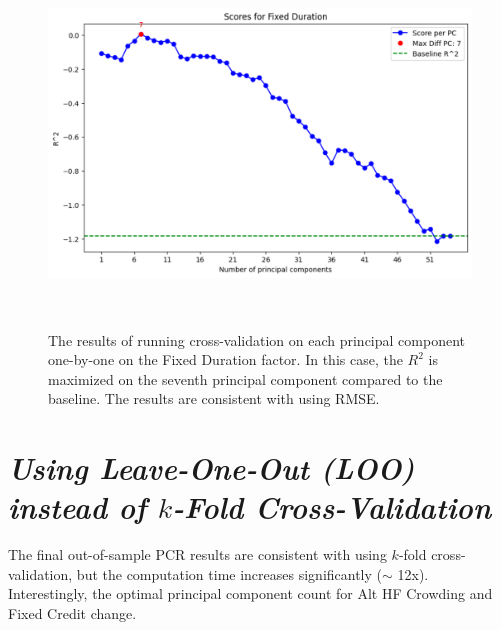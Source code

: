 \documentclass{ledger}
\begin{document}
\begin{figure}[!ht]
\centering
	\includegraphics[width=325pt]{FixedDuration_CV_PCA_R2.pdf}
	\caption{The results of running cross-validation on each principal component one-by-one on the Fixed Duration factor. In this case, the $R^2$ is maximized on the seventh principal component compared to the baseline. The results are consistent with using RMSE. \label{figure:fixed_duration_cv_pca_r2}} ~\\
\end{figure}

\newpage

\section*{\normalsize \textit{Using Leave-One-Out (LOO) instead of $k$-Fold Cross-Validation}}
The final out-of-sample PCR results are consistent with using $k$-fold cross-validation, but the computation time increases significantly ($\sim$ 12x). Interestingly, the optimal principal component count for Alt HF Crowding and Fixed Credit change. \\
\end{document}
